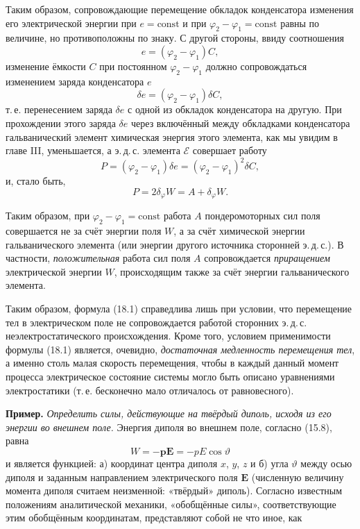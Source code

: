 \documentclass[a4paper,12pt]{article}
\begin{document}
Таким образом, сопровождающие перемещение обкладок конденсатора
изменения его электрической энергии при $e = \text{const}$ и при
$\varphi_2 - \varphi_1 = \text{const}$ равны по величине, но
противоположны по знаку. С другой стороны, ввиду соотношения
$$
    e = (\varphi_2 - \varphi_1)C,
$$
изменение ёмкости $C$ при постоянном $\varphi_2 - \varphi_1$ должно
сопровождаться изменением заряда конденсатора $e$
$$
    \delta e = (\varphi_2 - \varphi_1)\delta C,
$$
т.\,е. перенесением заряда $\delta e$ с одной из обкладок конденсатора
на другую. При прохождении этого заряда $\delta e$ через включённый
между обкладками конденсатора гальванический элемент химическая энергия
этого элемента, как мы увидим в главе III, уменьшается, а э.\,д.\,с.
элемента $\mathcal{E}$ совершает работу
$$
    P = (\varphi_2 - \varphi_1)\delta e = (\varphi_2 - \varphi_1)^2\delta C,
$$
и, стало быть,
\begin{equation}
    P = 2\delta_\varphi W = A + \delta_\varphi W.
    \tag{18.5}
\end{equation}


Таким образом, при $\varphi_2 - \varphi_1 = \text{const}$ работа $A$
пондеромоторных сил поля совершается не за счёт энергии поля $W$,
а за счёт химической энергии гальванического элемента (или энергии
другого источника сторонней э.\,д.\,с.). В частности, \textit{положительная}
работа сил поля $A$ сопровождается \textit{приращением} электрической
энергии $W$, происходящим также за счёт энергии гальванического элемента.

Таким образом, формула (18.1) справедлива лишь при условии, что
перемещение тел в электрическом поле не сопровождается работой
сторонних э.\,д.\,с. неэлектростатического происхождения. Кроме того,
условием применимости формулы (18.1) является, очевидно, \textit{достаточная
медленность перемещения тел}, а именно столь малая скорость перемещения,
чтобы в каждый данный момент процесса электрическое состояние системы
могло быть описано уравнениями электростатики (т.\,е. бесконечно мало
отличалось от равновесного).

\medskip
\noindent\textbf{Пример.} \textit{Определить силы, действующие на твёрдый
диполь, исходя из его энергии во внешнем поле.} Энергия диполя во
внешнем поле, согласно (15.8), равна
$$
    W = -\mathbf{p}\mathbf{E} = -pE\cos\vartheta
$$
и является функцией: а) координат центра диполя $x$, $y$, $z$ и б)
угла $\vartheta$ между осью диполя и заданным направлением электрического
поля $\mathbf{E}$ (численную величину момента диполя считаем
неизменной: «твёрдый» диполь). Согласно известным положениям
аналитической механики, «обобщённые силы», соответствующие этим
обобщённым координатам, представляют собой не что иное, как
\end{document}
